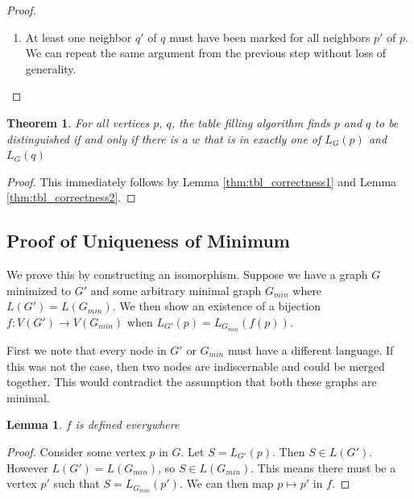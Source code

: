 \documentclass[12pt]{article}
\newtheorem{theorem}{Theorem}
\newtheorem{lemma}{Lemma}
\begin{document}
\begin{proof}
\begin{enumerate}
\begin{enumerate}
\begin{enumerate}
            Since $p'$ is a neighbor of $p$ and $q'$ is a neighbor of $q$, this
            directly shows that $w \in L_G(p) \oplus w \in L_G(q')$.
        \end{enumerate}
        \item At least one neighbor $q'$ of $q$ must have been marked for all
        neighbors $p'$ of $p$. We can repeat the same argument from the previous
        step without loss of generality.
    \end{enumerate}
\end{enumerate}

\end{proof}

\begin{theorem}
For all vertices $p$, $q$, the table filling algorithm finds $p$ and $q$ to be
distinguished if and only if there is a $w$ that is in exactly one of $L_G(p)$ and $L_G(q)$
\end{theorem}
\begin{proof}
This immediately follows by Lemma \ref{thm:tbl_correctness1} and Lemma \ref{thm:tbl_correctness2}.
\end{proof}

\clearpage

\subsection{Proof of Uniqueness of Minimum}

We prove this by constructing an isomorphism. Suppose we have a graph
$G$ minimized to $G'$ and some arbitrary minimal graph $G_{min}$ where
$L(G')=L(G_{min})$. We then show an existence of a bijection
$f : V(G') \rightarrow V(G_{min})$ when $L_{G'}(p) = L_{G_{min}}(f(p))$.

First we note that every node in $G'$ or $G_{min}$ must have a different
language. If this was not the case, then two nodes are indiscernable and
could be merged together. This would contradict the assumption that
both these graphs are minimal.

\begin{lemma}
\label{thm:bijection1}
$f$ is defined everywhere
\end{lemma}
\begin{proof}
Consider some vertex $p$ in $G$. Let $S=L_{G'}(p)$. Then $S \in L(G')$. However
$L(G')=L(G_{min})$, so $S \in L(G_{min})$. This means there must be a vertex $p'$
such that $S=L_{G_{min}}(p')$. We can then map $p \mapsto p'$ in $f$.
\end{proof}
\end{document}

